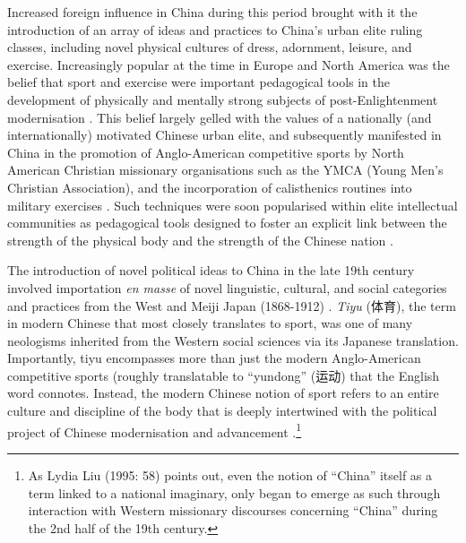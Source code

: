 Increased foreign influence in China during this period brought with it the introduction of an array of ideas and practices to China's urban elite ruling classes, including novel physical cultures of dress, adornment, leisure, and exercise.  Increasingly popular at the time in Europe and North America was the belief that sport and exercise were important pedagogical tools in the development of physically and mentally strong subjects of post-Enlightenment modernisation \citep{Elias1986}.  This belief largely gelled with the values of a nationally (and internationally) motivated Chinese urban elite, and subsequently manifested in China in the promotion of Anglo-American competitive sports by North American Christian missionary organisations such as the YMCA (Young Men’s Christian Association), and the incorporation of calisthenics routines into military exercises \citep[240]{Morris2004}.  Such techniques were soon popularised within elite intellectual communities as pedagogical tools designed to foster an explicit link between the strength of the physical body and the strength of the Chinese nation \cites[32]{Morris2004}[49]{Brownell1995}.

The introduction of novel political ideas to China in the late 19th century involved importation \textit{en masse} of novel linguistic, cultural, and social categories and practices from the West and Meiji Japan (1868-1912) \citep{Liu1995}. \textit{Tiyu} (体育), the term in modern Chinese that most closely translates to sport, was one of many neologisms inherited from the Western social sciences via its Japanese translation.  Importantly, tiyu encompasses more than just the modern Anglo-American competitive sports (roughly translatable to ``yundong'' (运动) that the English word connotes.  Instead, the modern Chinese notion of sport refers to an entire culture and discipline of the body that is deeply intertwined with the political project of Chinese modernisation and advancement \citep{Morris2004}.\footnote{As Lydia Liu (1995: 58) points out, even the notion of “China” itself as a term linked to a national imaginary, only began to emerge as such through interaction with Western missionary discourses concerning ``China'' during the 2nd half of the 19th century.}

